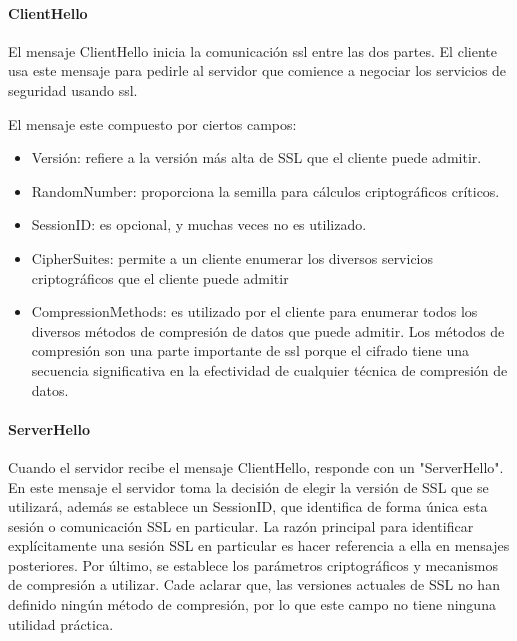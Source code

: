 \paragraph*{ClientHello}
El mensaje ClientHello inicia la comunicación ssl entre las dos partes. 
El cliente usa este mensaje para pedirle al servidor que comience a 
negociar los servicios de seguridad usando ssl.

El mensaje este compuesto por ciertos campos: 
\begin{itemize}
   \item Versión: refiere a la versión más alta de SSL que el cliente 
   puede admitir. 
   \item RandomNumber: proporciona la semilla para cálculos criptográficos
   críticos. 
   \item SessionID: es opcional, y muchas veces no es utilizado. 
   \item CipherSuites: permite a un cliente enumerar los diversos 
   servicios criptográficos que el cliente puede admitir
   \item CompressionMethods: es utilizado por el cliente para enumerar 
   todos los diversos métodos de compresión de datos que puede admitir.
    Los métodos de compresión son una parte importante de ssl porque el 
    cifrado tiene una secuencia significativa en la efectividad de 
    cualquier técnica de compresión de datos. 
\end{itemize}


\paragraph*{ServerHello}
Cuando el servidor recibe el mensaje ClientHello, responde con un 
"ServerHello". En este mensaje el servidor toma la decisión de elegir 
la versión de SSL que se utilizará, además se establece un SessionID, 
que identifica de forma única esta sesión o comunicación SSL en particular. 
La razón principal para identificar explícitamente una sesión SSL en 
particular es hacer referencia a ella en mensajes posteriores. Por 
último, se establece los parámetros criptográficos y mecanismos de 
compresión a utilizar. Cade aclarar que, las versiones actuales de 
SSL no han definido ningún método de compresión, por lo que este 
campo no tiene ninguna utilidad práctica.

